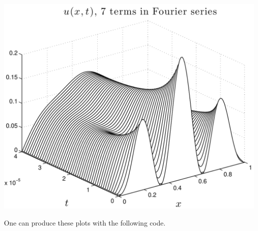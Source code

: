 {\begin{solution}
\begin{enumerate}
\begin{center}
\includegraphics[scale=0.5]{fourth_wf7}
\end{center}

One can produce these plots with the following code.

\end{enumerate}
\end{solution}}{}

